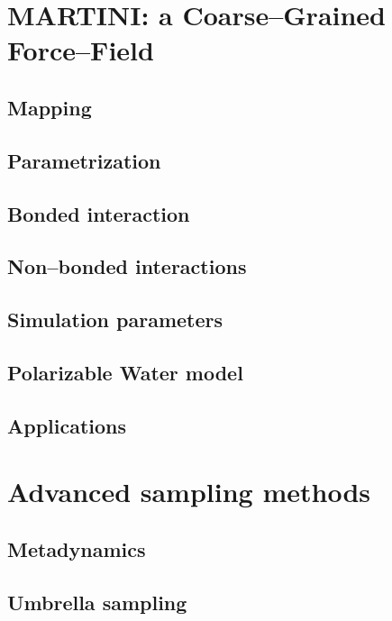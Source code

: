 \section{MARTINI: a Coarse--Grained Force--Field}
	\subsection{Mapping}
	\subsection{Parametrization}
	\subsection{Bonded interaction}
	\subsection{Non--bonded interactions}
	\subsection{Simulation parameters}
	\subsection{Polarizable Water model}
	\subsection{Applications}

\section{Advanced sampling methods}
	\subsection{Metadynamics}

	\subsection{Umbrella sampling} %
